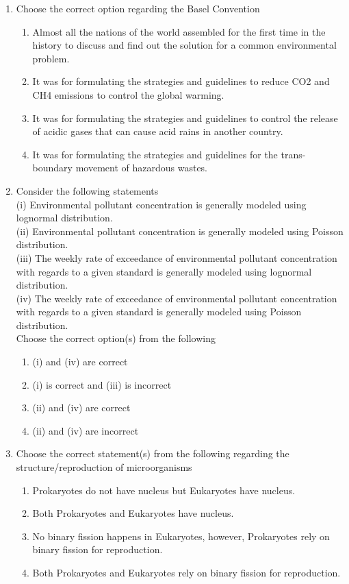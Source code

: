 \documentclass[journal]{IEEEtran}
\begin{document}
\begin{enumerate}[resume]
\item Choose the correct option regarding the Basel Convention
\hfill{}
\begin{enumerate}
\item Almost all the nations of the world assembled for the first time in the history to discuss and find out the solution for a common environmental problem.
\item It was for formulating the strategies and guidelines to reduce CO2 and CH4 emissions to control the global warming.
\item It was for formulating the strategies and guidelines to control the release of acidic gases that can cause acid rains in another country.
\item It was for formulating the strategies and guidelines for the trans-boundary movement of hazardous wastes.
\end{enumerate}

\item Consider the following statements \\
(i) Environmental pollutant concentration is generally modeled using lognormal distribution. \\
(ii) Environmental pollutant concentration is generally modeled using Poisson distribution. \\
(iii) The weekly rate of exceedance of environmental pollutant concentration with regards to a given standard is generally modeled using lognormal distribution. \\
(iv) The weekly rate of exceedance of environmental pollutant concentration with regards to a given standard is generally modeled using Poisson distribution. \\
Choose the correct option(s) from the following
\hfill{}
\begin{enumerate}
\item (i) and (iv) are correct
\item (i) is correct and (iii) is incorrect
\item (ii) and (iv) are correct
\item (ii) and (iv) are incorrect
\end{enumerate}

\item Choose the correct statement(s) from the following regarding the structure/reproduction of microorganisms
\hfill{}
\begin{enumerate}
\item Prokaryotes do not have nucleus but Eukaryotes have nucleus.
\item Both Prokaryotes and Eukaryotes have nucleus.
\item No binary fission happens in Eukaryotes, however, Prokaryotes rely on binary fission for reproduction.
\item Both Prokaryotes and Eukaryotes rely on binary fission for reproduction.
\end{enumerate}


\end{enumerate}
\end{document}
